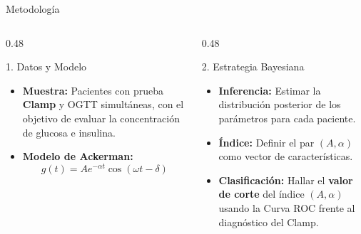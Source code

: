 \documentclass{beamer}
\begin{document}
    \begin{frame}{Metodología}

    \justifying
    \begin{columns}[t]
        
        \begin{column}{0.48\textwidth}
            \begin{block}{1. Datos y Modelo}
                \begin{itemize}
                    \small %
                    \item \textbf{Muestra:} Pacientes con prueba
                    \textbf{Clamp} y OGTT simultáneas, con el objetivo de evaluar la concentración de glucosa e insulina.
                    \vspace{0.2cm}
                    \item \textbf{Modelo de Ackerman:}
                    $$g(t) = A e^{-\alpha t} \cos (\omega t - \delta)$$
                \end{itemize}
            \end{block}
        \end{column}

        \begin{column}{0.48\textwidth}
            \begin{block}{2. Estrategia Bayesiana}
                \begin{itemize}
                    \small
                    \item \textbf{Inferencia:} Estimar la distribución posterior de los parámetros para cada paciente.
                    \vspace{0.2cm}
                    \item \textbf{Índice:} Definir el par $(A, \alpha)$ como vector de características.
                    \vspace{0.2cm}
                    \item \textbf{Clasificación:} Hallar el \textbf{valor de corte} del índice   $(A, \alpha)$  usando la Curva ROC frente al diagnóstico del Clamp.
                \end{itemize}
            \end{block}
        \end{column}
        
    \end{columns}
\end{frame}
\end{document}
